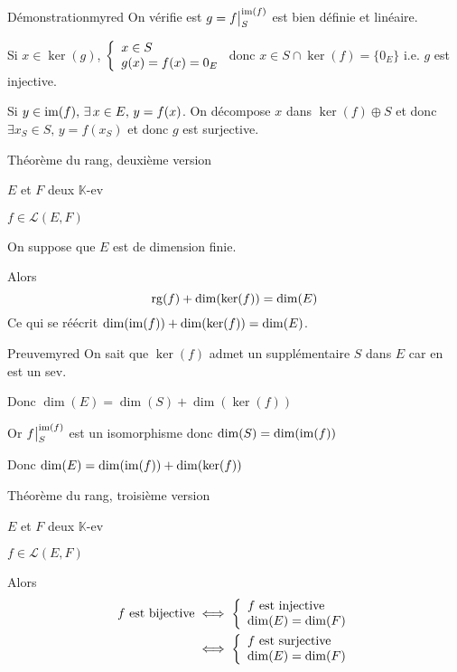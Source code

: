     \begin{demo}{Démonstration}{myred}
        On vérifie est $g = \restrcorestr{f}{S}{\im(f)}$ est bien définie et linéaire.
        
        Si $x \in \ker(g)$, $\et{x \in S}{g(x)=f(x)=0_E}$ donc $x \in S \cap \ker(f) = \big\{ 0_E \big\}$ i.e. $g$ est injective.
        
        Si $y \in \operatorname{im}(f), \, \exists \, x \in E, \, y = f(x)$. On décompose $x$ dans $\ker(f) \oplus S$ et donc $\exists x_S \in S, \, y = f(x_S)$ et donc $g$ est surjective.
    \end{demo}
    
    \begin{theo}{Théorème du rang, deuxième version}{}
        \begin{soient}
            \item $E$ et $F$ deux $\mathbb{K}$-ev
            \item $f \in \mathcal{L}(E,F)$
        \end{soient}
        On suppose que $E$ est de dimension finie.
    
        Alors \[ \operatorname{rg}(f) + \dim(\ker(f)) = \dim(E) \]
        Ce qui se réécrit $\dim(\operatorname{im}(f)) + \dim(\ker(f)) = \dim(E)$.
    \end{theo}
    
    \begin{demo}{Preuve}{myred}
        On sait que $\ker(f)$ admet un supplémentaire $S$ dans $E$ car en est un sev.
        
        Donc $\dim(E) = \dim(S) + \dim(\ker(f))$
        
        Or $\restrcorestr{f}{S}{\im(f)}$ est un isomorphisme donc $\dim(S) = \dim(\operatorname{im}(f))$ 
        
        Donc $\dim(E) = \dim(\operatorname{im}(f)) + \dim(\ker(f))$
    \end{demo}
    
    \begin{theo}{Théorème du rang, troisième version}{}
        \begin{soient}
            \item $E$ et $F$ deux $\mathbb{K}$-ev
            \item $f \in \mathcal{L}(E,F)$
        \end{soient}
        Alors \begin{align*}
            f \text{ est bijective} & \iff \et{f \text{ est injective}}{\dim(E) = \dim(F)} \\
            & \iff \et{f \text{ est surjective}}{\dim(E) = \dim(F)}
        \end{align*}
    \end{theo}
    
